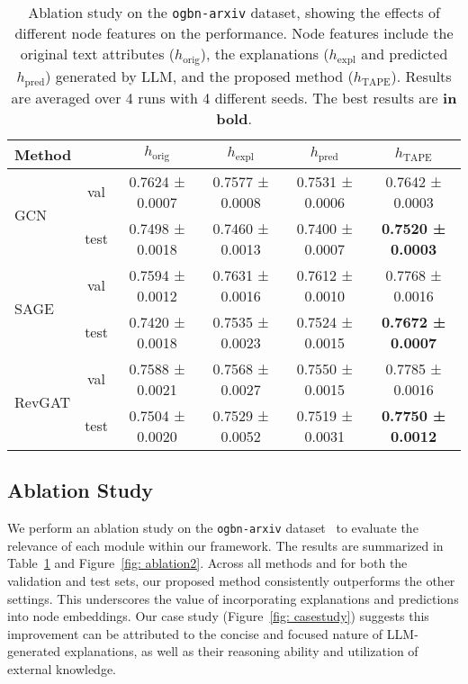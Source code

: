 \documentclass{article}
\begin{document}
\begin{table}[t]
\small
\caption{Ablation study on the \texttt{ogbn-arxiv} dataset, showing the effects of different node features on the performance. Node features include the original text attributes ($h_{\textrm{orig}}$), the explanations ($h_{\textrm{expl}}$  and predicted $h_{\textrm{pred}}$) generated by LLM, and the proposed method ($h_{\textrm{TAPE}}$). Results are averaged over 4 runs with 4 different seeds. The best results are \textbf{in bold}.}
    \label{tab: ablation}
    \centering
    \begin{tabular}{lccccc}
    \toprule
    \multicolumn{2}{l}{Method}   &  $h_{\textrm{orig}}$ & $h_{\textrm{expl}}$ & $h_{\textrm{pred}}$ & $h_{\textrm{TAPE}}$\\
    \midrule
    \multirow{2}{*}{GCN}
    & val & 0.7624 ± 0.0007 & 0.7577 ± 0.0008 & 0.7531 ± 0.0006 & 0.7642 ± 0.0003\\
    & test & 0.7498 ± 0.0018 & 0.7460 ± 0.0013 & 0.7400 ± 0.0007 & \textbf{0.7520 ± 0.0003}\\
    \midrule
    \multirow{2}{*}{SAGE}
    & val & 0.7594 ± 0.0012 & 0.7631 ± 0.0016 & 0.7612 ± 0.0010 & 0.7768 ± 0.0016\\
    & test & 0.7420 ± 0.0018 & 0.7535 ± 0.0023 & 0.7524 ± 0.0015 & \textbf{0.7672 ± 0.0007}\\
    \midrule
    \multirow{2}{*}{RevGAT}
    & val & 0.7588 ± 0.0021 &  0.7568 ± 0.0027 &  0.7550 ± 0.0015 & 0.7785 ± 0.0016\\
    & test & 0.7504 ± 0.0020 & 0.7529 ± 0.0052 & 0.7519 ± 0.0031 & \textbf{0.7750 ± 0.0012}
    \\ \bottomrule
    \end{tabular}
\end{table}

\subsection{Ablation Study}\label{subsec: ablation study}

We perform an ablation study on the \texttt{ogbn-arxiv} dataset~\citep{hu2020open} to evaluate the relevance of each module within our framework. The results are summarized in Table~\ref{tab: ablation} and Figure~\ref{fig: ablation2}. Across all methods and for both the validation and test sets, our proposed method consistently outperforms the other settings. This underscores the value of incorporating explanations and predictions into node embeddings. Our case study (Figure~\ref{fig: casestudy}) suggests this improvement can be attributed to the concise and focused nature of LLM-generated explanations, as well as their reasoning ability and utilization of external knowledge.
\end{document}
